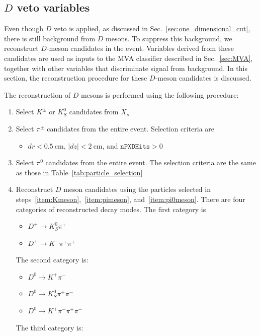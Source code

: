 \subsection{$D$ veto variables}
\label{sec:Dveto_reconstruction}
Even though $D$ veto is applied, as discussed in Sec.~\ref{sec:one_dimensional_cut}, there is still background from $D$ mesons.
To suppress this background, we reconstruct $D$-meson candidates in the event.
Variables derived from these candidates are used as inputs to the MVA classifier described in Sec.~\ref{sec:MVA}, together with other variables that discriminate signal from background.
In this section, the reconstruction procedure for these $D$-meson candidates is discussed.

The reconstruction of $D$ mesons is performed using the following procedure:
\begin{enumerate}
  \item \label{item:Kmeson} Select $K^{\pm}$ or $K_{S}^{0}$ candidates from $X_{s}$
  \item \label{item:pimeson} Select $\pi^{\pm}$ candidates from the entire event. Selection criteria are
  \begin{itemize}
    \item $dr < 0.5~\textrm{cm}$, $\left| dz \right| < 2~\textrm{cm}$, and $\texttt{nPXDHits} > 0$
  \end{itemize}
  \item \label{item:pi0meson} Select $\pi^{0}$ candidates from the entire event. The selection criteria are the same as those in Table~\ref{tab:particle_selection}
  \item Reconstruct $D$ meson candidates using the particles selected in steps~\ref{item:Kmeson},~\ref{item:pimeson}, and~\ref{item:pi0meson}. There are four categories of reconstructed decay modes. The first category is
  \begin{itemize}
    \item $D^{+} \rightarrow K_{S}^{0} \pi^{+}$
    \item $D^{+} \rightarrow K^{-} \pi^{+} \pi^{+}$
  \end{itemize}
  The second category is:
  \begin{itemize}
    \item $D^{0} \rightarrow K^{+} \pi^{-}$
    \item $D^{0} \rightarrow K_{S}^{0} \pi^{+} \pi^{-}$
    \item $D^{0} \rightarrow K^{+} \pi^{-} \pi^{+} \pi^{-}$
  \end{itemize}
  The third category is:

\end{enumerate}
